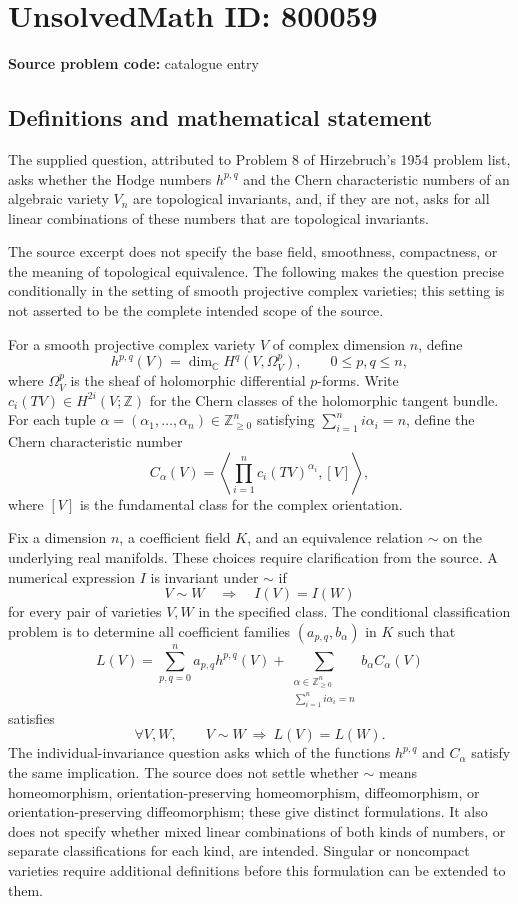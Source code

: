 \documentclass[11pt]{article}
\newcommand{\Z}{\mathbb{Z}}
\newcommand{\C}{\mathbb{C}}
\begin{document}
\section*{UnsolvedMath ID: 800059}
\textbf{Source problem code:} catalogue entry
\subsection{Definitions and mathematical statement}
The supplied question, attributed to Problem 8 of Hirzebruch's 1954 problem list, asks whether the Hodge numbers \(h^{p,q}\) and the Chern characteristic numbers of an algebraic variety \(V_n\) are topological invariants, and, if they are not, asks for all linear combinations of these numbers that are topological invariants.

The source excerpt does not specify the base field, smoothness, compactness, or the meaning of topological equivalence. The following makes the question precise conditionally in the setting of smooth projective complex varieties; this setting is not asserted to be the complete intended scope of the source.

For a smooth projective complex variety \(V\) of complex dimension \(n\), define
\[
h^{p,q}(V)=\dim_{\C}H^q(V,\Omega_V^p),\qquad 0\leq p,q\leq n,
\]
where \(\Omega_V^p\) is the sheaf of holomorphic differential \(p\)-forms. Write \(c_i(TV)\in H^{2i}(V;\Z)\) for the Chern classes of the holomorphic tangent bundle. For each tuple \(\alpha=(\alpha_1,\ldots,\alpha_n)\in\Z_{\geq0}^n\) satisfying \(\sum_{i=1}^n i\alpha_i=n\), define the Chern characteristic number
\[
C_\alpha(V)=\left\langle\prod_{i=1}^n c_i(TV)^{\alpha_i},[V]\right\rangle,
\]
where \([V]\) is the fundamental class for the complex orientation.

Fix a dimension \(n\), a coefficient field \(K\), and an equivalence relation \(\sim\) on the underlying real manifolds. These choices require clarification from the source. A numerical expression \(I\) is invariant under \(\sim\) if
\[
V\sim W\quad\Longrightarrow\quad I(V)=I(W)
\]
for every pair of varieties \(V,W\) in the specified class. The conditional classification problem is to determine all coefficient families \((a_{p,q},b_\alpha)\) in \(K\) such that
\[
L(V)=\sum_{p,q=0}^{n}a_{p,q}h^{p,q}(V)
+\sum_{\substack{\alpha\in\Z_{\geq0}^{n}\\\sum_{i=1}^{n}i\alpha_i=n}}b_\alpha C_\alpha(V)
\]
satisfies
\[
\forall V,W,\qquad V\sim W\ \Longrightarrow\ L(V)=L(W).
\]
The individual-invariance question asks which of the functions \(h^{p,q}\) and \(C_\alpha\) satisfy the same implication. The source does not settle whether \(\sim\) means homeomorphism, orientation-preserving homeomorphism, diffeomorphism, or orientation-preserving diffeomorphism; these give distinct formulations. It also does not specify whether mixed linear combinations of both kinds of numbers, or separate classifications for each kind, are intended. Singular or noncompact varieties require additional definitions before this formulation can be extended to them.
\end{document}
